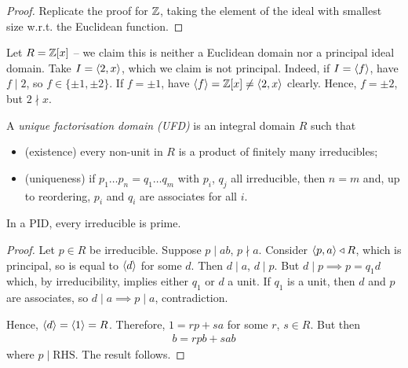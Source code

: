 \documentclass{../template/note}
\begin{document}
    \begin{proof}
        Replicate the proof for $\mathbb Z$, taking the element of the ideal with smallest size w.r.t. the Euclidean function.
    \end{proof}
    
    \begin{example*}
        Let $R = \mathbb Z[x]$ -- we claim this is neither a Euclidean domain nor a principal ideal domain. Take $I = \left \langle 2, x \right \rangle$, which we claim is not principal. Indeed, if $I = \left \langle f \right \rangle$, have $f \mid 2$, so $f \in \{\pm 1, \pm 2\}$. If $f = \pm 1$, have $\left \langle f \right \rangle = \mathbb Z[x] \neq \left \langle 2, x \right \rangle$ clearly. Hence, $f = \pm 2$, but $2 \nmid x$.
    \end{example*}
    
    \begin{definition}
        A \emph{unique factorisation domain (UFD)} is an integral domain $R$ such that
        \begin{itemize}
            \item (existence) every non-unit in $R$ is a product of finitely many irreducibles;
            \item (uniqueness) if $p_1\dots p_n = q_1 \dots q_m$ with $p_i$, $q_j$ all irreducible, then $n=m$ and, up to reordering, $p_i$ and $q_i$ are associates for all $i$.
        \end{itemize}
    \end{definition}
    
    \begin{lemma}
        In a PID, every irreducible is prime.
    \end{lemma}
    
    \begin{proof}
        Let $p \in R$ be irreducible. Suppose $p \mid ab$, $p \nmid a$. Consider $\left \langle p, a \right \rangle \triangleleft R$, which is principal, so is equal to $\left \langle d \right \rangle$ for some $d$. Then $d \mid a$, $d \mid p$. But $d \mid p \implies p = q_1d$ which, by irreducibility, implies either $q_1$ or $d$ a unit. If $q_1$ is a unit, then $d$ and $p$ are associates, so $d \mid a \implies p \mid a$, contradiction.

        Hence, $\left \langle d \right \rangle = \left \langle 1 \right \rangle = R$. Therefore, $1 = rp + sa$ for some $r$, $s \in R$. But then
        \begin{align*}
            b = rpb + sab
        \end{align*}
        where $p \mid \text{RHS}$. The result follows.        
    \end{proof}
    
\end{document}
